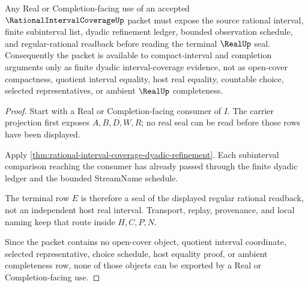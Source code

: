 \begin{theorem}
\label{thm:rational-interval-coverage-real-completion-nonescape}
Any Real or Completion-facing use of an accepted $\RationalIntervalCoverageUp$ packet must expose the source rational interval, finite subinterval list, dyadic refinement ledger, bounded observation schedule, and regular-rational readback before reading the terminal $\RealUp$ seal. Consequently the packet is available to compact-interval and completion arguments only as finite dyadic interval-coverage evidence, not as open-cover compactness, quotient interval equality, host real equality, countable choice, selected representatives, or ambient $\RealUp$ completeness.
\end{theorem}
\begin{proof}
Start with a Real or Completion-facing consumer of $I$. The carrier projection first exposes $A,B,D,W,R$; no real seal can be read before those rows have been displayed.

Apply \autoref{thm:rational-interval-coverage-dyadic-refinement}. Each subinterval comparison reaching the consumer has already passed through the finite dyadic ledger and the bounded StreamName schedule.

The terminal row $E$ is therefore a seal of the displayed regular rational readback, not an independent host real interval. Transport, replay, provenance, and local naming keep that route inside $H,C,P,N$.

Since the packet contains no open-cover object, quotient interval coordinate, selected representative, choice schedule, host equality proof, or ambient completeness row, none of those objects can be exported by a Real or Completion-facing use.
\end{proof}



